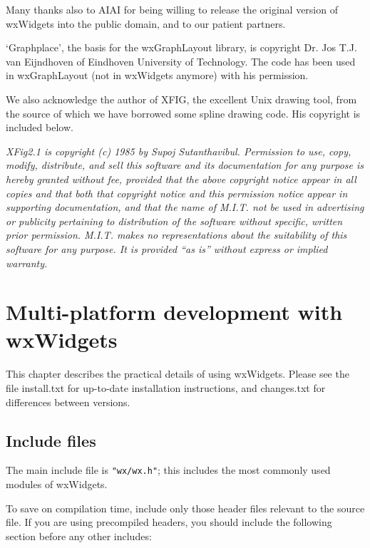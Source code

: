 Many thanks also to AIAI for being willing to release the original version of
wxWidgets into the public domain, and to our patient partners.

`Graphplace', the basis for the wxGraphLayout library, is copyright Dr. Jos
T.J. van Eijndhoven of Eindhoven University of Technology. The code has
been used in wxGraphLayout (not in wxWidgets anymore) with his permission.

We also acknowledge the author of XFIG, the excellent Unix drawing tool,
from the source of which we have borrowed some spline drawing code.
His copyright is included below.

{\it XFig2.1 is copyright (c) 1985 by Supoj Sutanthavibul. Permission to
use, copy, modify, distribute, and sell this software and its
documentation for any purpose is hereby granted without fee, provided
that the above copyright notice appear in all copies and that both that
copyright notice and this permission notice appear in supporting
documentation, and that the name of M.I.T. not be used in advertising or
publicity pertaining to distribution of the software without specific,
written prior permission.  M.I.T. makes no representations about the
suitability of this software for any purpose.  It is provided ``as is''
without express or implied warranty.}

\chapter{Multi-platform development with wxWidgets}\label{multiplat}
%
\setfooter{\thepage}{}{}{}{}{\thepage}%

This chapter describes the practical details of using wxWidgets. Please
see the file install.txt for up-to-date installation instructions, and
changes.txt for differences between versions.

\section{Include files}\label{includefiles}

The main include file is {\tt "wx/wx.h"}; this includes the most commonly
used modules of wxWidgets.

To save on compilation time, include only those header files relevant to the
source file. If you are using precompiled headers, you should include
the following section before any other includes:

